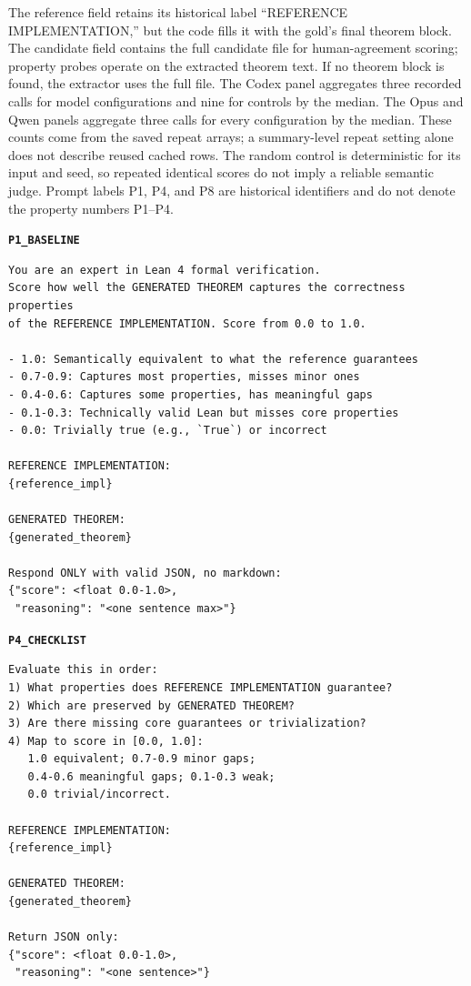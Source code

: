 The reference field retains its historical label ``REFERENCE IMPLEMENTATION,'' but the code fills it with the gold's final theorem block.
The candidate field contains the full candidate file for human-agreement scoring; property probes operate on the extracted theorem text.
If no theorem block is found, the extractor uses the full file.
The Codex panel aggregates three recorded calls for model configurations and nine for controls by the median.
The Opus and Qwen panels aggregate three calls for every configuration by the median.
These counts come from the saved repeat arrays; a summary-level repeat setting alone does not describe reused cached rows.
The random control is deterministic for its input and seed, so repeated identical scores do not imply a reliable semantic judge.
Prompt labels P1, P4, and P8 are historical identifiers and do not denote the property numbers P1--P4.

\noindent\textbf{\texttt{P1\_BASELINE}}\par
\vspace{0.25em}\begin{lstlisting}[style=promptstyle]
You are an expert in Lean 4 formal verification.
Score how well the GENERATED THEOREM captures the correctness properties
of the REFERENCE IMPLEMENTATION. Score from 0.0 to 1.0.

- 1.0: Semantically equivalent to what the reference guarantees
- 0.7-0.9: Captures most properties, misses minor ones
- 0.4-0.6: Captures some properties, has meaningful gaps
- 0.1-0.3: Technically valid Lean but misses core properties
- 0.0: Trivially true (e.g., `True`) or incorrect

REFERENCE IMPLEMENTATION:
{reference_impl}

GENERATED THEOREM:
{generated_theorem}

Respond ONLY with valid JSON, no markdown:
{"score": <float 0.0-1.0>,
 "reasoning": "<one sentence max>"}
\end{lstlisting}

\noindent\textbf{\texttt{P4\_CHECKLIST}}\par
\vspace{0.25em}
\begin{lstlisting}[style=promptstyle]
Evaluate this in order:
1) What properties does REFERENCE IMPLEMENTATION guarantee?
2) Which are preserved by GENERATED THEOREM?
3) Are there missing core guarantees or trivialization?
4) Map to score in [0.0, 1.0]:
   1.0 equivalent; 0.7-0.9 minor gaps;
   0.4-0.6 meaningful gaps; 0.1-0.3 weak;
   0.0 trivial/incorrect.

REFERENCE IMPLEMENTATION:
{reference_impl}

GENERATED THEOREM:
{generated_theorem}

Return JSON only:
{"score": <float 0.0-1.0>,
 "reasoning": "<one sentence>"}
\end{lstlisting}

